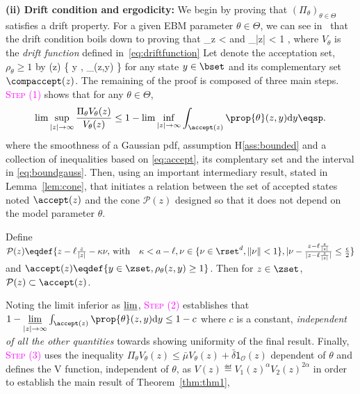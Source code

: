 \documentclass[letterpaper]{article} %
\begin{document}
\medskip
\noindent \textbf{(ii) Drift condition and ergodicity: }
We begin by proving that $(\Pi_\theta)_{\theta \in \Theta}$ satisfies a drift property.
For a given EBM parameter $\theta \in \Theta$, we can see in~\citet{jarner2000geometric} that the drift condition boils down to proving that
\beq\notag
\sup \limits_{z \in \zset}   < \infty \quad \textrm{and} \quad \lim \sup \limits_{|z| \to \infty}   < 1 \eqsp,
\eeq
where $V_\theta$ is the \emph{drift function} defined in~\eqref{eq:driftfunction}
Let denote the acceptation set, \ie\ $\rho_\theta \geq 1$ by 
\beq\label{eq:accept}
\accept(z) \eqdef \{ y \in \zset, \rho_\theta(z,y)  \}
\eeq
for any state $y \in \bset$ and its complementary set $\compaccept(z)$.
The remaining of the proof is composed of three main steps. 
\textcolor{magenta}{\textsc{Step (1)}} shows that for any $\theta \in \Theta$,
\begin{align}\notag
\lim \sup \limits_{|z| \to \infty}  \frac{\Pi_\theta V_\theta(z)}{V_\theta(z)} \leq 1 - \lim \inf \limits_{|z| \to \infty}  \int_{\accept(z)} \prop{\theta}(z,y)  \textrm{d}y \eqsp.
\end{align}
where the smoothness of a Gaussian pdf, assumption H\ref{ass:bounded} and a collection of inequalities based on \eqref{eq:accept}, its complentary set and the interval in \eqref{eq:boundgauss}.
Then, using an important intermediary result, stated in Lemma~\ref{lem:cone}, that initiates a relation between the set of accepted states noted $\accept(z)$ and the cone $\mathcal{P}(z)$ designed so that it does not depend on the model parameter $\theta$. 
\begin{lemm}\label{lem:cone}
Define $\mathcal{P}(z) \eqdef \{ z- \ell \frac{z}{|z|} - \kappa \nu , \, \textrm{with} \quad \kappa < a - \ell  , \nu \in \{ \nu \in \rset^d, \| \nu \| < 1\}, |\nu - \frac{z- \ell \frac{z}{|z|} }{|z- \ell \frac{z}{|z|} |} \leq \frac{\epsilon}{2}   \}$ and $\accept(z) \eqdef \{ y \in \zset, \rho_\theta(z,y) \geq 1 \}$. Then for $z \in \zset$, $\mathcal{P}(z) \subset \accept(z)$.
\end{lemm}
Noting the limit inferior as $\varliminf$, 
\textcolor{magenta}{\textsc{Step (2)}} establishes that $1 - \varliminf \limits_{|z| \to \infty}  \int_{\accept(z)} \prop{\theta}(z,y)  \textrm{d}y \leq 1 - c$ where $c$ is a constant, \emph{independent of all the other quantities} towards showing uniformity of the final result.
Finally, 
\textcolor{magenta}{\textsc{Step (3)}} uses the inequality $\Pi_\theta V_\theta(z) \leq \bar{\mu} V_\theta(z) + \bar{\delta} \mathsf{1}_{\mathcal{O}}(z)$ dependent of $\theta$ and defines the V function, independent of $\theta$, as $V(z) \eqdef V_1(z)^\alpha V_2(z)^{2\alpha}$ in order to establish the main result of Theorem~\ref{thm:thm1}, \ie
\end{document}
